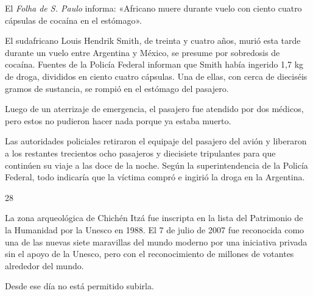 \documentclass[12pt,twoside,openright,a5paper]{book}
\begin{document}
\nopagebreak

\vspace{0.5cm}

\nopagebreak

El \emph{Folha de S. Paulo} informa: «Africano muere
durante vuelo con ciento cuatro cápsulas de cocaína en el estómago».

El sudafricano
Louis Hendrik Smith, de treinta y cuatro años, murió esta tarde durante un vuelo entre
Argentina y México, se presume por sobredosis de cocaína. Fuentes de
la Policía Federal informan que Smith había ingerido 1,7 kg de droga,
divididos en ciento cuatro cápsulas. Una de ellas, con cerca de dieciséis gramos de sustancia,
se rompió en el estómago del pasajero.

Luego de un aterrizaje de emergencia, el pasajero fue atendido por dos
médicos, pero estos no pudieron hacer nada porque ya estaba muerto.

Las autoridades policiales retiraron el equipaje del pasajero del avión y
liberaron a los restantes trecientos ocho pasajeros y diecisiete tripulantes para que continúen
su viaje a las doce de la noche.  Según la superintendencia de la Policía
Federal, todo indicaría que la víctima compró e ingirió la droga en
la Argentina.

\vspace{0.5cm}
\afterpage{}
\hrulefill \hspace{0.1cm}\decofourleft\hspace{0.2cm} 28 \hspace{0.2cm}\decofourright \hspace{0.1cm}\hrulefill

\nopagebreak

\vspace{0.5cm}

\nopagebreak

La zona arqueológica de Chichén Itzá fue inscripta en la lista del
Patrimonio de la Humanidad por la Unesco en 1988. El 7 de julio de 2007 fue
reconocida como una de las nuevas siete maravillas del mundo moderno por
una iniciativa privada sin el apoyo de la Unesco, pero con el reconocimiento
de millones de votantes alrededor del mundo.

Desde ese día no está permitido subirla.

\vspace{0.5cm}
\end{document}
